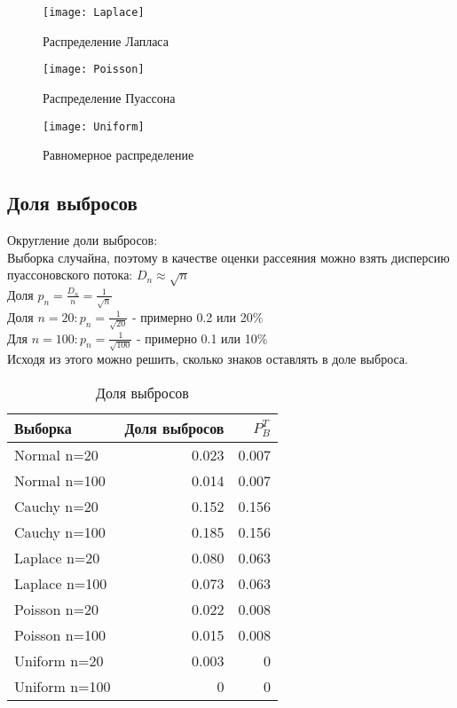 \documentclass[a4paper]{article}
\begin{document}
\begin{figure}[H]
    \centering 
	\texttt{[image: Laplace]}
	\label{fig:laplaceBox}
	\caption{Распределение Лапласа} 
\end{figure}

\begin{figure}[H]
	\centering
	\texttt{[image: Poisson]}
	\label{fig:poissonBox}
	\caption{Распределение Пуассона} 
\end{figure}

\begin{figure}[H]
	\centering
	\texttt{[image: Uniform]}
	\label{fig:uniBox}
	\caption{Равномерное распределение} 
\end{figure}

\subsection{Доля выбросов}

\noindent Округление доли выбросов:\\
Выборка случайна, поэтому в качестве оценки рассеяния можно взять дисперсию пуассоновского потока:  $D_n \approx \sqrt{n}$\\
Доля $p_n = \frac{D_n}{n}=\frac{1}{\sqrt{n}}$\\
Доля $n=20: p_n=\frac{1}{\sqrt{20}}$ - примерно 0.2 или 20\% \\
Для $n=100: p_n=\frac{1}{\sqrt{100}}$ - примерно 0.1 или 10\% \\
Исходя из этого можно решить, сколько знаков оставлять в доле выброса.
\begin{table}[H]
	\centering
	\begin{tabular}[t]{lrr}
		\hline
		Выборка   &      Доля выбросов	& $P_B^T$		\\
		\hline
		Normal n=20   	&	0.023 		& 0.007		\\
		Normal n=100   	&  	0.014		& 0.007\\
		Cauchy n=20 	& 	0.152  		& 0.156		\\
		Cauchy n=100	&  	0.185 		& 0.156\\
		Laplace n=20	& 	0.080  		& 0.063	\\
		Laplace n=100	&   0.073 		& 0.063\\
		Poisson n=20	&	0.022 		& 0.008		\\
		Poisson n=100	&	0.015		& 0.008	\\
		Uniform n=20	&	0.003 		& 0		\\
		Uniform n=100	&	0 			& 0	\\
		\hline
	\end{tabular}
	\caption{Доля выбросов}
	\label{tab:eject}
\end{table}
\end{document}
